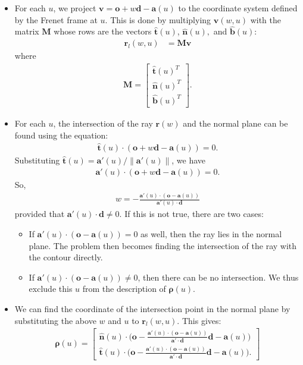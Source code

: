 \documentclass[10pt]{article}
\newcommand{\ve}[1]{\bm{#1}}
\begin{document}
\begin{itemize}
  \item For each $u$, we project $\ve{v} = \ve{o} + w\ve{d} - \ve{a}(u)$ to the coordinate system defined by the Frenet frame at $u$. This is done by multiplying $\ve{v}(w,u)$ with the matrix $\ve{M}$ whose rows are the vectors $\hat{\ve{t}}(u)$, $\hat{\ve{n}}(u),$ and $\hat{\ve{b}}(u)$:
  \begin{align*}
    \ve{r}_l(w,u) &= \ve{M}\ve{v}
  \end{align*}
  where
  \begin{align*}
    \ve{M} = \begin{bmatrix}
      \hat{\ve{t}}(u)^T\\
      \hat{\ve{n}}(u)^T\\
      \hat{\ve{b}}(u)^T
    \end{bmatrix}.
  \end{align*}

  \item For each $u$, the intersection of the ray $\ve{r}(w)$ and the normal plane can be found using the equation:
  \begin{align*}
    \hat{\ve{t}}(u) \cdot (\ve{o} + w \ve{d} - \ve{a}(u)) = 0.
  \end{align*}
  Substituting $\hat{\ve{t}}(u) = \ve{a}'(u)/\| \ve{a}'(u) \|$, we have
  \begin{align*}
    \ve{a}'(u) \cdot (\ve{o} + w \ve{d} - \ve{a}(u)) = 0.
  \end{align*}
  So,
  \begin{align*}
    w = - \frac{\ve{a}'(u) \cdot (\ve{o} - \ve{a}(u))}{\ve{a}'(u) \cdot \ve{d}}
  \end{align*}
  provided that $\ve{a}'(u) \cdot \ve{d} \neq 0$. If this is not true, there are two cases:
  \begin{itemize}
    \item If $\ve{a}'(u) \cdot (\ve{o} - \ve{a}(u)) = 0$ as well, then the ray lies in the normal plane. The problem then becomes finding the intersection of the ray with the contour directly.
    
    \item If $\ve{a}'(u) \cdot (\ve{o} - \ve{a}(u)) \neq 0$, then there can be no intersection. We thus exclude this $u$ from the description of $\ve{\rho}(u).$
  \end{itemize}
  
  
  \item We can find the coordinate of the intersection point in the normal plane by substituting the above $w$ and $u$ to $\ve{r}_l(w, u)$. This gives:
  \begin{align*}
    \ve{\rho}(u) = \begin{bmatrix}
      \hat{\ve{n}}(u) \cdot \big( \ve{o} - \frac{\ve{a}'(u) \cdot(\ve{o} - \ve{a}(u))}{\ve{a}' \cdot \ve{d}} \ve{d} - \ve{a}(u) \big)\\
      \hat{\ve{t}}(u) \cdot \big( \ve{o} - \frac{\ve{a}'(u) \cdot(\ve{o} - \ve{a}(u))}{\ve{a}' \cdot \ve{d}} \ve{d} - \ve{a}(u) \big).
    \end{bmatrix}
  \end{align*}  
\end{itemize}
\end{document}
